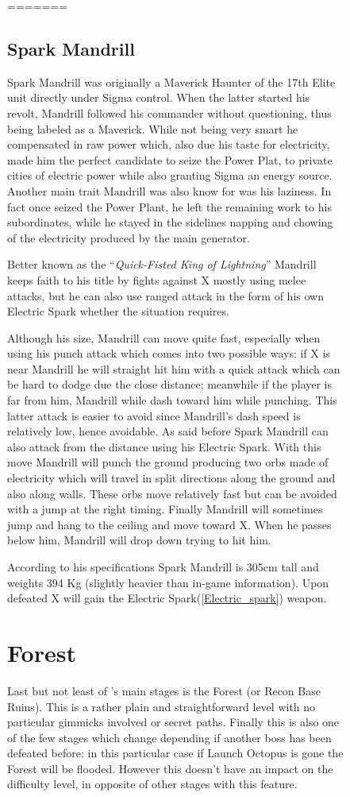 \begin{figure}[htp]
=======

\subsection{Spark Mandrill}\label{boss:Spark_mandrill}
Spark Mandrill was originally a Maverick Haunter of the 17th Elite unit directly under Sigma control. When the latter started his revolt, Mandrill followed his commander without questioning, thus being labeled as a Maverick. While not being very smart he compensated in raw power\cite{MHX:manual} which, also due his taste for electricity, made him the perfect candidate to seize the Power Plat, to private cities of electric power while also granting Sigma an energy source. Another main trait Mandrill was also know for was his laziness. In fact once seized the Power Plant, he left the remaining work to his subordinates, while he stayed in the sidelines napping and chowing of the electricity produced by the main generator\cite{wayback:X_resources}.

Better known as the ``\textit{Quick-Fisted King of Lightning}'' Mandrill keeps faith to his title by fights against X mostly using melee attacks, but he can also use ranged attack in the form of his own Electric Spark whether the situation requires.

Although his size, Mandrill can move quite fast, especially when using his punch attack which comes into two possible ways\cite{wiki:Spark_mandrill}: if X is near Mandrill he will straight hit him with a quick attack which can be hard to dodge due the close distance; meanwhile if the player is far from him, Mandrill while dash toward him while punching. This latter attack is easier to avoid since Mandrill's dash speed is relatively low, hence avoidable.  As said before Spark Mandrill can also attack from the distance using his Electric Spark. With this move Mandrill will punch the ground producing two orbs made of electricity which will travel in split directions along the ground and also along walls. These orbs move relatively fast but can be avoided with a jump at the right timing. Finally Mandrill will sometimes jump and hang to the ceiling and move toward X. When he passes below him, Mandrill will drop down trying to hit him. 

According to his specifications Spark Mandrill is 305cm tall and weights 394 Kg (slightly heavier than in-game information). Upon defeated X will gain the Electric Spark(\ref{Electric_spark}) weapon.
\section{Forest}
Last but not least of \x's main stages is the Forest (or Recon Base Ruins). This is a rather plain and straightforward level with no particular gimmicks involved or secret paths. Finally this is also one of the few stages which change depending if another boss has been defeated before: in this particular case if Launch Octopus is gone the Forest will be flooded. However this doesn't have an impact on the difficulty level, in opposite of other stages with this feature.


\end{figure}
